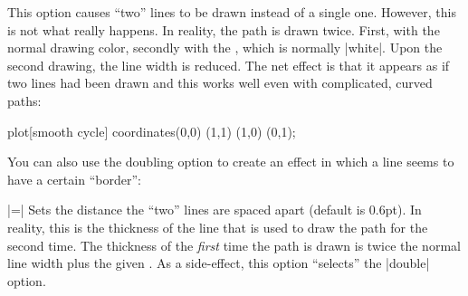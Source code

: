 \begin{itemize}
  This option causes ``two'' lines to be drawn instead of a single
  one. However, this is not what really happens. In reality, the path
  is drawn twice. First, with the normal drawing color, secondly with
  the , which is normally |white|. Upon the second
  drawing, the line width is reduced. The net effect is that it
  appears as if two lines had been drawn and this works well even with
  complicated, curved paths:

\begin{codeexample}[]
\tikz \draw[double]
  plot[smooth cycle] coordinates{(0,0) (1,1) (1,0) (0,1)};
\end{codeexample}

  You can also use the doubling option to create an effect in which a
  line seems to have a certain ``border'':

\begin{codeexample}[]
\end{codeexample}

  |=|
  Sets the distance the ``two'' lines are spaced apart (default is
  0.6pt). In reality, this is the thickness of the line that is used
  to draw the path for the second time. The thickness of the
  \emph{first} time the path is drawn is twice the normal line width
  plus the given . As a side-effect, this option
  ``selects'' the |double| option.

\begin{codeexample}[]
\end{codeexample}
\end{itemize}


  




